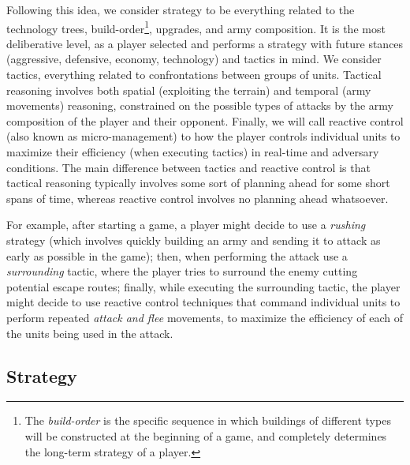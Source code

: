\documentclass[journal]{IEEEtran}
\begin{document}
Following this idea, we consider strategy to be everything related to the technology trees, build-order\footnote{The {\em build-order} is the specific sequence in which buildings of different types will be constructed at the beginning of a game, and completely determines the long-term strategy of a player.}, upgrades, and army composition. It is the most deliberative level, as a player selected and performs a strategy with future stances (aggressive, defensive, economy, technology) and tactics in mind. We consider tactics, everything related to confrontations between groups of units. Tactical reasoning involves both spatial (exploiting the terrain) and temporal (army movements) reasoning, constrained on the possible types of attacks by the army composition of the player and their opponent. Finally, we will call reactive control (also known as micro-management) to how the player controls individual units to maximize their efficiency (when executing tactics) in real-time and adversary conditions. The main difference between tactics and reactive control is that tactical reasoning typically involves some sort of planning ahead for some short spans of time, whereas reactive control involves no planning ahead whatsoever.

For example, after starting a game, a player might decide to use a {\em rushing} strategy (which involves quickly building an army and sending it to attack as early as possible in the game); then, when performing the attack use a {\em surrounding} tactic, where the player tries to surround the enemy cutting potential escape routes; finally, while executing the surrounding tactic, the player might decide to use reactive control techniques that command individual units to perform repeated {\em attack and flee} movements, to maximize the efficiency of each of the units being used in the attack.



\subsection{Strategy}
\end{document}
